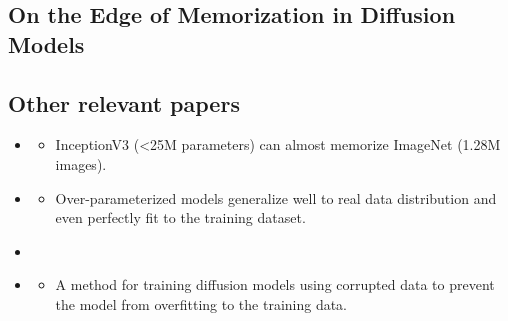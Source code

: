 \documentclass{article}
\begin{document}
\subsection{On the Edge of Memorization in Diffusion Models}


\subsection{Other relevant papers}
\begin{itemize}
    \item {}
    \begin{itemize}
        \item InceptionV3 (<25M parameters) can almost memorize ImageNet (1.28M images).
    \end{itemize}
    \item {}
    \begin{itemize}
        \item Over-parameterized models generalize well to real data distribution and even perfectly fit to the training dataset.
    \end{itemize}
    \item {}
    \item {}
    \begin{itemize}
        \item A method for training diffusion models using corrupted data to prevent the model from overfitting to the training data.
    \end{itemize}
\end{itemize}
\end{document}
